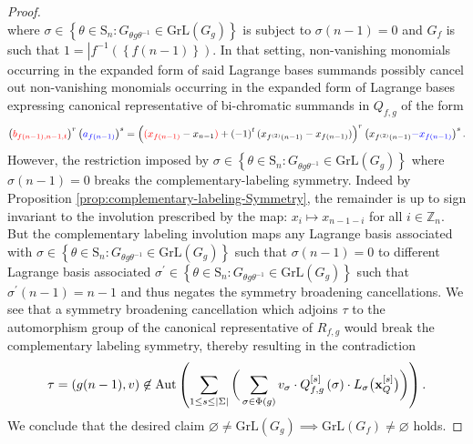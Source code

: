 \begin{proof}
\[\]
where $\sigma\in\left\{ \theta\in\text{S}_{n}:G_{\theta g\theta^{-1}}\in\text{GrL}\left(G_{g}\right)\right\} $
is subject to $\sigma\left(n-1\right)=0$ and $G_{f}$ is such that
$1=\left|f^{-1}\left(\left\{ f\left(n-1\right)\right\} \right)\right.$.
In that setting, non-vanishing monomials occurring in the expanded
form of said Lagrange bases summands possibly cancel out non-vanishing
monomials occurring in the expanded form of Lagrange bases expressing
canonical representative of bi-chromatic summands in $Q_{f,g}$ of
the form
\[
\left({\color{red}b_{f(n-1),n-1,t}}\right)^{r}\left({\color{blue}a_{f\left(n-1\right)}}\right)^{s}=\left({\color{red}(x_{f\left(n-1\right)}}-x_{n-1}{\color{red})}+\left(-1\right)^{t}(x_{f^{(2)}\left(n-1\right)}-x_{f\left(n-1\right)})\right)^{r}\left(x_{f^{\left(2\right)}\left(n-1\right)}{\color{blue}-x_{f\left(n-1\right)}}\right)^{s}.
\]
However, the restriction imposed by
$\sigma\in\left\{ \theta\in\text{S}_{n}:G_{\theta g\theta^{-1}}\in\text{GrL}\left(G_{g}\right)\right\}
$ where $\sigma\left(n-1\right)=0$ breaks the complementary-labeling
symmetry. Indeed by Proposition \ref{prop:complementary-labeling-Symmetry}, the remainder
is up to sign invariant to the involution prescribed by the map: $x_{i}\mapsto x_{n-1-i}$
for all $i\in\mathbb{Z}_{n}$. But the complementary labeling involution
maps any Lagrange basis associated with $\sigma\in\left\{ \theta\in\text{S}_{n}:G_{\theta g\theta^{-1}}\in\text{GrL}\left(G_{g}\right)\right\} $
such that $\sigma\left(n-1\right)=0$ to different Lagrange basis
associated $\sigma^{\prime}\in\left\{ \theta\in\text{S}_{n}:G_{\theta g\theta^{-1}}\in\text{GrL}\left(G_{g}\right)\right\} $
such that $\sigma^{\prime}\left(n-1\right)=n-1$ and thus negates
the symmetry broadening cancellations. We see that a symmetry
broadening cancellation which adjoins $\tau$ to the automorphism
group of the canonical representative of $R_{f,g}$ would break the
complementary labeling symmetry, thereby resulting in the contradiction
\[
\tau=\left(g(n-1),v\right) \not\in\text{Aut}\left(\sum_{1\leq s\leq\left|\Sigma\right|}\bigg(\sum_{\sigma\in\Phi(g)}v_{\sigma}\cdot Q_{f,g}^{\left[s\right]}\left(\sigma\right)\cdot L_{\sigma}\big({\bf x}_{Q}^{\left[s\right]}\big)\bigg)\right).
\]
We conclude that the desired claim $\varnothing \ne \text{GrL}\left(G_{g}\right)\implies\text{GrL}\left(G_{f}\right)\ne \varnothing$
holds.
\end{proof}

